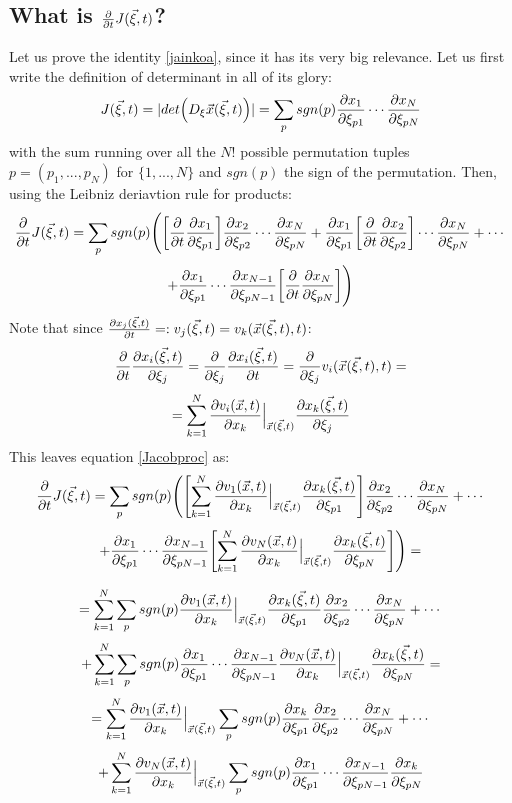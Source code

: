 \documentclass[11pt, a4paper]{article} %
\begin{document}
\subsection*{ What is $\pdv{}{t}J(\vec{\xi},t)$?\vspace{-0.2cm}}
Let us prove the identity \eqref{jainkoa}, since it has its very big relevance. Let us first write the definition of determinant in all of its glory:
\begin{equation}
J(\vec{\xi},t)=|det \Big( D_\xi \vec{x}(\vec{\xi},t) \Big)|=\sum_p sgn(p) \pdv{x_1}{\xi_{p1}} \cdots \pdv{x_N}{\xi_{pN}}
\end{equation}
with the sum running over all the $N!$ possible permutation tuples $p=(p_1,...,p_N)$ for $\{1,...,N\}$ and $sgn(p)$ the sign of the permutation. Then, using the Leibniz deriavtion rule for products:
\begin{equation}\label{Jacobproc}
\pdv{}{t}J(\vec{\xi},t)=\sum_p sgn(p) \Bigg(\qty[\pdv{}{t}\pdv{x_1}{\xi_{p1}}]\pdv{x_2}{\xi_{p2}} \cdots \pdv{x_N}{\xi_{pN}}+\pdv{x_1}{\xi_{p1}}\qty[\pdv{}{t}\pdv{x_2}{\xi_{p2}}] \cdots \pdv{x_N}{\xi_{pN}}+\cdots
\end{equation}
$$
+\pdv{x_1}{\xi_{p1}} \cdots \pdv{x_{N-1}}{\xi_{pN-1}}\qty[\pdv{}{t}\pdv{x_N}{\xi_{pN}}]\Bigg)
$$
Note that since $\pdv{x_j(\vec{\xi},t)}{t}=:v_j(\vec{\xi},t)=v_k(\vec{x}(\vec{\xi},t),t)$:
\begin{equation}
\pdv{}{t}\pdv{x_i(\vec{\xi},t)}{\xi_j}=\pdv{}{\xi_j}\pdv{x_i(\vec{\xi},t)}{t}=\pdv{}{\xi_j}v_i(\vec{x}(\vec{\xi},t),t)=
\end{equation}
$$
=\sum_{k=1}^N \pdv{v_i(\vec{x},t)}{x_k}\Big\rvert_{\vec{x}(\vec{\xi},t)}\pdv{x_k(\vec{\xi},t)}{\xi_j}
$$
This leaves equation \eqref{Jacobproc} as:
\begin{equation}
\pdv{}{t}J(\vec{\xi},t)=\sum_p sgn(p) \Bigg(\qty[\sum_{k=1}^N \pdv{v_1(\vec{x},t)}{x_k}\Big\rvert_{\vec{x}(\vec{\xi},t)}\pdv{x_k(\vec{\xi},t)}{\xi_{p1}}]\pdv{x_2}{\xi_{p2}} \cdots \pdv{x_N}{\xi_{pN}}+\cdots
\end{equation}
$$
+\pdv{x_1}{\xi_{p1}} \cdots \pdv{x_{N-1}}{\xi_{pN-1}}\qty[\sum_{k=1}^N \pdv{v_N(\vec{x},t)}{x_k}\Big\rvert_{\vec{x}(\vec{\xi},t)}\pdv{x_k(\vec{\xi},t)}{\xi_{pN}}]\Bigg)=
$$

$$
=\sum_{k=1}^N\sum_p sgn(p) \pdv{v_1(\vec{x},t)}{x_k}\Big\rvert_{\vec{x}(\vec{\xi},t)}\pdv{x_k(\vec{\xi},t)}{\xi_{p1}}\pdv{x_2}{\xi_{p2}} \cdots \pdv{x_N}{\xi_{pN}}+\cdots 
$$
$$
+ \sum_{k=1}^N\sum_p sgn(p)\pdv{x_1}{\xi_{p1}} \cdots \pdv{x_{N-1}}{\xi_{pN-1}}\pdv{v_N(\vec{x},t)}{x_k}\Big\rvert_{\vec{x}(\vec{\xi},t)}\pdv{x_k(\vec{\xi},t)}{\xi_{pN}}=
$$
$$
=\sum_{k=1}^N \pdv{v_1(\vec{x},t)}{x_k}\Big\rvert_{\vec{x}(\vec{\xi},t)}\sum_p sgn(p)\pdv{x_k}{\xi_{p1}}\pdv{x_2}{\xi_{p2}} \cdots \pdv{x_N}{\xi_{pN}}+\cdots 
$$
$$
+ \sum_{k=1}^N\pdv{v_N(\vec{x},t)}{x_k}\Big\rvert_{\vec{x}(\vec{\xi},t)}\sum_p sgn(p)\pdv{x_1}{\xi_{p1}} \cdots \pdv{x_{N-1}}{\xi_{pN-1}}\pdv{x_k}{\xi_{pN}}
$$
\end{document}
